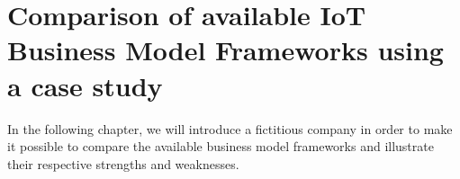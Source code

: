 
\section{Comparison of available IoT Business Model Frameworks using a case study}
	In the following chapter, we will introduce a fictitious company in order to make it possible to compare the available business model frameworks and illustrate their respective strengths and weaknesses.


